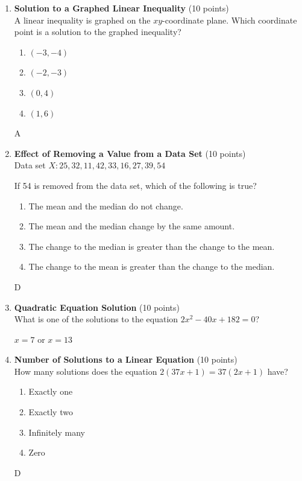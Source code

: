 \begin{enumerate}
  \item \textbf{Solution to a Graphed Linear Inequality} (10 points)\\
  A linear inequality is graphed on the $xy$-coordinate plane. Which coordinate point is a solution to the graphed inequality?
  \begin{enumerate}[label=(\Alph*)]
    \item $(-3,-4)$
    \item $(-2,-3)$
    \item $(0,4)$
    \item $(1,6)$
  \end{enumerate}
  \begin{subanswer}
    A
  \end{subanswer}


  \item \textbf{Effect of Removing a Value from a Data Set} (10 points)\\
  Data set $X: 25,32,11,42,33,16,27,39,54$

  If 54 is removed from the data set, which of the following is true?
  \begin{enumerate}[label=(\Alph*)]
    \item The mean and the median do not change.
    \item The mean and the median change by the same amount.
    \item The change to the median is greater than the change to the mean.
    \item The change to the mean is greater than the change to the median.
  \end{enumerate}
  \begin{subanswer}
    D
  \end{subanswer}




  
  \item \textbf{Quadratic Equation Solution} (10 points)\\
  What is one of the solutions to the equation $2x^2 - 40x + 182 = 0$?
  \begin{subanswer}
    $x=7$ or $x=13$
  \end{subanswer}






  \item \textbf{Number of Solutions to a Linear Equation} (10 points)\\
  How many solutions does the equation $2(37x+1) = 37(2x+1)$ have?
  \begin{enumerate}[label=(\Alph*)]
    \item Exactly one
    \item Exactly two
    \item Infinitely many
    \item Zero
  \end{enumerate}
  \begin{subanswer}
    D
  \end{subanswer}


\end{enumerate}
